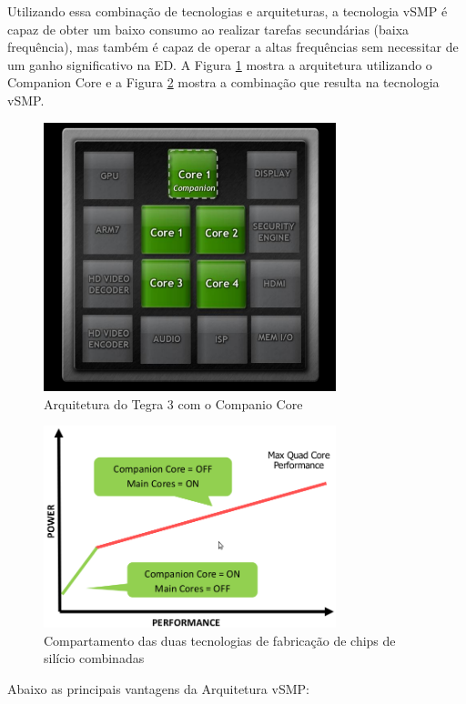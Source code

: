 \documentclass[article]{IEEEtran}
\begin{document}
Utilizando essa combina\c{c}\~ao de tecnologias e arquiteturas, a tecnologia vSMP \'e capaz de obter um baixo consumo ao realizar tarefas secund\'arias (baixa frequ\^encia), mas tamb\'em \'e capaz de operar a altas frequ\^encias sem necessitar de um ganho significativo na ED. A Figura \ref{fig:companiocore} mostra a arquitetura utilizando o Companion Core e a Figura \ref{fig:vsmp} mostra a combina\c{c}\~ao que resulta na tecnologia vSMP.

\begin{figure}[ht]
  \centering
  \includegraphics[width=8.5cm]{./pictures/CompanionCore.pdf}
  \caption{Arquitetura do Tegra 3 com o Companio Core}
  \label{fig:companiocore}
\end{figure}

\begin{figure}[ht]
  \centering
  \includegraphics[width=8.5cm]{./pictures/vSMP.png}
  \caption{Compartamento das duas tecnologias de fabrica\c{c}\~ao de chips de sil\'icio combinadas}
  \label{fig:vsmp}
\end{figure}

Abaixo as principais vantagens da Arquitetura vSMP:
\end{document}
